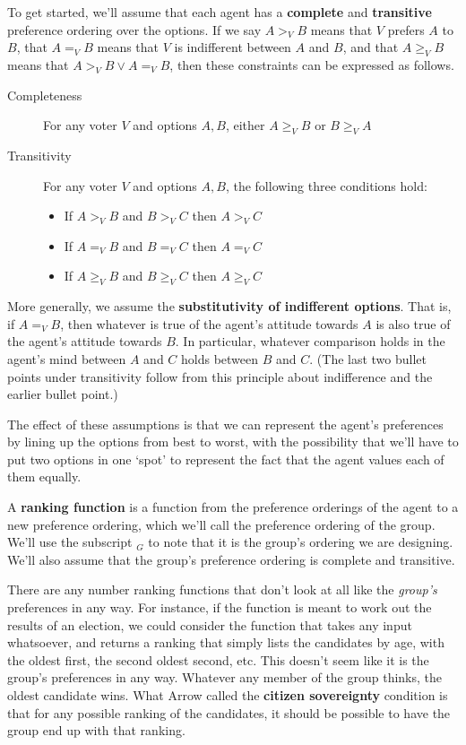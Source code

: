 \begin{multicols}{2}
To get started, we'll assume that each agent has a \textbf{complete} and \textbf{transitive} preference ordering over the options. If we say $A >_V B$ means that $V$ prefers $A$ to $B$, that $A =_V B$ means that $V$ is indifferent between $A$ and $B$, and that $A \geq_V B$ means that $A >_V B \vee A =_V B$, then these constraints can be expressed as follows.

\begin{description}
\item[Completeness] For any voter $V$ and options $A, B$, either $A \geq_V B$ or $B \geq_V A$
\item[Transitivity] For any voter $V$ and options $A, B$, the following three conditions hold:
	\begin{itemize}
	\item If $A >_V B$ and $B >_V C$ then $A >_V C$
	\item If $A =_V B$ and $B =_V C$ then $A =_V C$
	\item If $A \geq_V B$ and $B \geq_V C$ then $A \geq_V C$
	\end{itemize}
\end{description}
More generally, we assume the \textbf{substitutivity of indifferent options}. That is, if $A =_V B$, then whatever is true of the agent's attitude towards $A$ is also true of the agent's attitude towards $B$. In particular, whatever comparison holds in the agent's mind between $A$ and $C$ holds between $B$ and $C$. (The last two bullet points under transitivity follow from this principle about indifference and the earlier bullet point.)

The effect of these assumptions is that we can represent the agent's preferences by lining up the options from best to worst, with the possibility that we'll have to put two options in one `spot' to represent the fact that the agent values each of them equally.

A \textbf{ranking function} is a function from the preference orderings of the agent to a new preference ordering, which we'll call the preference ordering of the group. We'll use the subscript $_G$ to note that it is the group's ordering we are designing. We'll also assume that the group's preference ordering is complete and transitive. 

There are any number ranking functions that don't look at all like the \textit{group's} preferences in any way. For instance, if the function is meant to work out the results of an election, we could consider the function that takes any input whatsoever, and returns a ranking that simply lists the candidates by age, with the oldest first, the second oldest second, etc. This doesn't seem like it is the group's preferences in any way. Whatever any member of the group thinks, the oldest candidate wins. What Arrow called the \textbf{citizen sovereignty} condition is that for any possible ranking of the candidates, it should be possible to have the group end up with that ranking.


\end{multicols}
